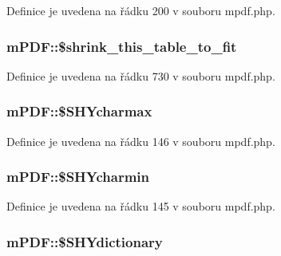 Definice je uvedena na řádku 200 v souboru mpdf.\-php.

\hypertarget{classm_p_d_f_af7713d9bb414f2d694f1e2ba40fb377d}{
\subsubsection[{\$shrink\-\_\-this\-\_\-table\-\_\-to\-\_\-fit}]{\setlength{\rightskip}{0pt plus 5cm}m\-P\-D\-F\-::\$shrink\-\_\-this\-\_\-table\-\_\-to\-\_\-fit}}\label{classm_p_d_f_af7713d9bb414f2d694f1e2ba40fb377d}


Definice je uvedena na řádku 730 v souboru mpdf.\-php.

\hypertarget{classm_p_d_f_a526dcca856605f53338e5e0bb5730b32}{
\subsubsection[{\$\-S\-H\-Ycharmax}]{\setlength{\rightskip}{0pt plus 5cm}m\-P\-D\-F\-::\$\-S\-H\-Ycharmax}}\label{classm_p_d_f_a526dcca856605f53338e5e0bb5730b32}


Definice je uvedena na řádku 146 v souboru mpdf.\-php.

\hypertarget{classm_p_d_f_a491381cb36c4eefa8ece990a5eb8956f}{
\subsubsection[{\$\-S\-H\-Ycharmin}]{\setlength{\rightskip}{0pt plus 5cm}m\-P\-D\-F\-::\$\-S\-H\-Ycharmin}}\label{classm_p_d_f_a491381cb36c4eefa8ece990a5eb8956f}


Definice je uvedena na řádku 145 v souboru mpdf.\-php.

\hypertarget{classm_p_d_f_a54f65cf874ec166233a1e26098b18e35}{
\subsubsection[{\$\-S\-H\-Ydictionary}]{\setlength{\rightskip}{0pt plus 5cm}m\-P\-D\-F\-::\$\-S\-H\-Ydictionary}}\label{classm_p_d_f_a54f65cf874ec166233a1e26098b18e35}


